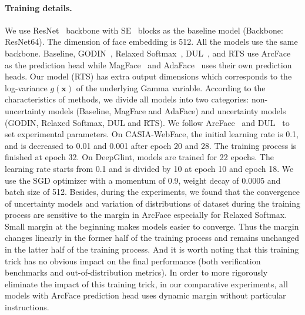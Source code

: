\documentclass[letterpaper]{article} %
\begin{document}
\paragraph{Training details.}
%
We use ResNet~\cite{he2016deep} backbone with SE~\cite{hu2018squeeze} blocks as the baseline model (Backbone: ResNet64). The dimension of face embedding is 512. All the models use the same backbone. Baseline, GODIN~\cite{hsu2020generalized}, Relaxed Softmax~\cite{techapanurak2019hyperparameter,neumann18relaxed}, DUL~\cite{chang2020data}, and RTS use ArcFace~\cite{deng2019arcface} as the prediction head while MagFace~\cite{meng2021magface} and AdaFace~\cite{kim2022adaface} uses their own prediction heads. Our model (RTS) has extra output dimensions which corresponds to the log-variance $g(\bm{x})$ of the underlying Gamma variable. According to the characteristics of methods, we divide all models into two categories: non-uncertainty models (Baseline, MagFace and AdaFace) and uncertainty models (GODIN, Relaxed Softmax, DUL and RTS).
%
We follow ArcFace~\cite{deng2019arcface} and DUL~\cite{chang2020data} to set experimental parameters. On CASIA-WebFace, the initial learning rate is 0.1, and is decreased to 0.01 and 0.001 after epoch 20 and 28. The training process is finished at epoch 32. On DeepGlint, models are trained for 22 epochs. The learning rate starts from 0.1 and is divided by 10 at epoch 10 and epoch 18. We use the SGD optimizer with a momentum of 0.9, weight decay of 0.0005 and batch size of 512. Besides, during the experiments, we found that the convergence of uncertainty models and variation of distributions of dataset during the training process are sensitive to the margin in ArcFace especially for Relaxed Softmax. Small margin at the beginning makes models easier to converge. Thus the margin changes linearly in the former half of the training process and remains unchanged in the latter half of the training process. And it is worth noting that this training trick has no obvious impact on the final performance (both verification benchmarks and out-of-distribution metrics). In order to more rigorously eliminate the impact of this training trick, in our comparative experiments, all models with ArcFace prediction head uses dynamic margin without particular instructions.
\end{document}
